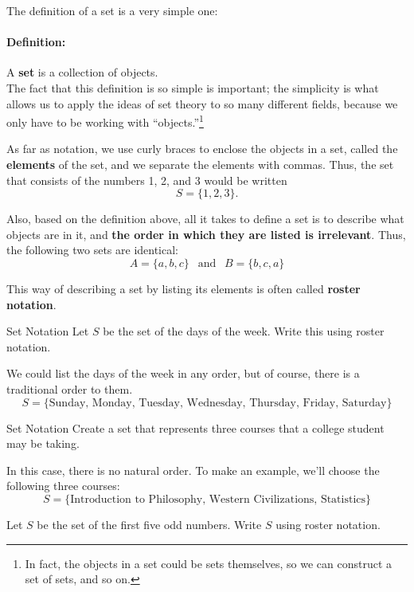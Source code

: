 \setcounter{ExampleCounter}{1}
The definition of a set is a very simple one:
\paragraph{Definition:} A \textbf{set} is a collection of objects.\\

The fact that this definition is so simple is important; the simplicity is what allows us to apply the ideas of set theory to so many different fields, because we only have to be working with ``objects.''\footnote{In fact, the objects in a set could be sets themselves, so we can construct a set of sets, and so on.}

As far as notation, we use curly braces to enclose the objects in a set, called the \textbf{elements} of the set, and we separate the elements with commas.  Thus, the set that consists of the numbers 1, 2, and 3 would be written
\[S = \{1, 2, 3\}.\]

Also, based on the definition above, all it takes to define a set is to describe what objects are in it, and \textbf{the order in which they are listed is irrelevant}.  Thus, the following two sets are identical:
\[A = \{a, b, c\} \ \ \textrm{ and } \ \ B = \{b, c, a\}\]

This way of describing a set by listing its elements is often called \textbf{roster notation}.

\begin{example}{Set Notation}
Let $S$ be the set of the days of the week.  Write this using roster notation.

\sol
We could list the days of the week in any order, but of course, there is a traditional order to them.
\[\boxed{S = \{\textrm{Sunday, Monday, Tuesday, Wednesday, Thursday, Friday, Saturday}}\}\]
\end{example}

\begin{example}{Set Notation}
Create a set that represents three courses that a college student may be taking.

\sol
In this case, there is no natural order.  To make an example, we'll choose the following three courses:
\[\boxed{S = \{\textrm{Introduction to Philosophy, Western Civilizations, Statistics}\}}\]
\end{example}

\begin{try}
Let $S$ be the set of the first five odd numbers.  Write $S$ using roster notation.
\end{try}

